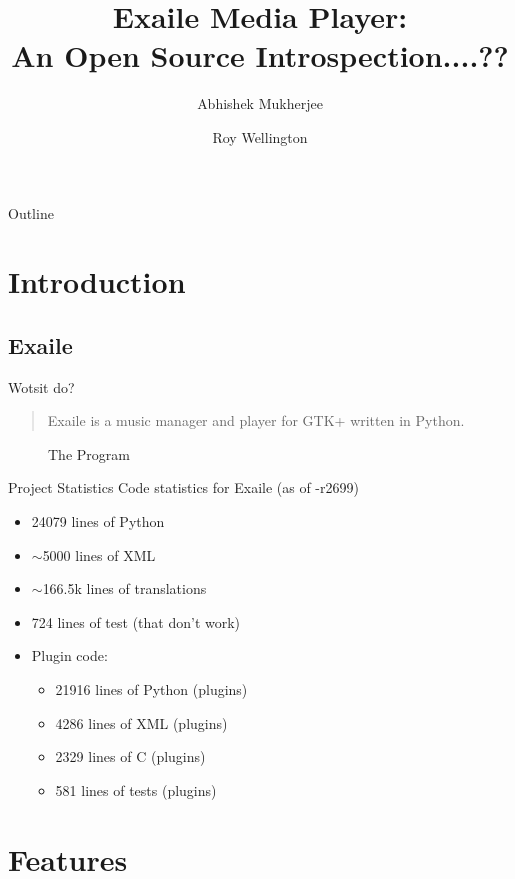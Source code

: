 \documentclass{beamer}
\title
{%
  Exaile Media Player:\\
  An Open Source Introspection....?? %
}
\author
{
  Abhishek Mukherjee \and
  Roy Wellington
}
\begin{document}
\lstset{language=Python}

\begin{frame}
  \titlepage
\end{frame}

\begin{frame}{Outline}
  \tableofcontents
\end{frame}


\section{Introduction}

\subsection{Exaile}

\begin{frame}{Wotsit do?}
  \begin{quote}
    Exaile is a music manager and player for GTK+ written in Python.
  \end{quote}
  \begin{figure}
    \caption{The Program}
  \end{figure}
\end{frame}

\begin{frame}{Project Statistics}
  Code statistics for Exaile (as of -r2699)
  \begin{itemize}
    \item 24079 lines of Python
    \item $\sim$5000 lines of XML
    \item $\sim$166.5k lines of translations
    \item 724 lines of test (that don't work)
	\item Plugin code:
	\begin{itemize}
      \item 21916 lines of Python (plugins)
      \item 4286 lines of XML (plugins)
      \item 2329 lines of C (plugins)
      \item 581 lines of tests (plugins)
	\end{itemize}
  \end{itemize}
\end{frame}

\section{Features}
\end{document}
